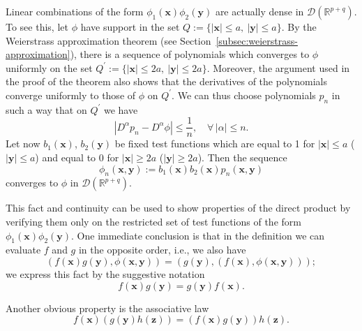 Linear combinations of the form $\phi_1(\bm{x})\phi_2(\bm{y})$ are actually dense in $\mathcal{D}(\mathbb{R}^{p+q})$. To see this, let $\phi$ have support in the set $Q:=\{|\bm{x}|\leq a,\ |\bm{y}|\leq a\}$. By the Weierstrass approximation theorem (see Section~\ref{subsec:weierstrass-approximation}), there is a sequence of polynomials which converges to $\phi$ uniformly on the set $Q^{\prime}:=\{|\bm{x}|\leq2a,\ |\bm{y}|\leq2a\}$. Moreover, the argument used in the proof of the theorem also shows that the derivatives of the polynomials converge uniformly to those of $\phi$ on $Q^{\prime}$. We can thus choose polynomials $p_n$ in such a way that on $Q^{\prime}$ we have
\begin{equation}\label{eq:direct-product-polynomial-derivative-approximation}
|D^\alpha p_n-D^\alpha\phi|\leq\dfrac1n,\quad\forall\,|\alpha|\leq n.
\end{equation}
Let now $b_1(\bm{x})$, $b_2(\bm{y})$ be fixed test functions which are equal to 1 for $|\bm{x}|\leq a$ ($|\bm{y}|\leq a$) and equal to 0 for $|\bm{x}|\geq2a$ ($|\bm{y}|\geq2a$). Then the sequence
\begin{equation}\label{eq:direct-product-cutoff-polynomial-approximation}
\phi_n(\bm{x},\bm{y}):=b_1(\bm{x})b_2(\bm{x})p_n(\bm{x},\bm{y})
\end{equation}
converges to $\phi$ in $\mathcal{D}(\mathbb{R}^{p+q})$.

This fact and continuity can be used to show properties of the direct product by verifying them only on the restricted set of test functions of the form $\phi_1(\bm{x})\phi_2(\bm{y})$. One immediate conclusion is that in the definition we can evaluate $f$ and $g$ in the opposite order, i.e., we also have
\begin{equation}\label{eq:direct-product-reversed-pairing}
(f(\bm{x})g(\bm{y}),\phi(\bm{x},\bm{y}))=(g(\bm{y}),(f(\bm{x}),\phi(\bm{x},\bm{y})));
\end{equation}
we express this fact by the suggestive notation
\begin{equation}\label{eq:distribution-direct-product-commutativity}
f(\bm{x})g(\bm{y})=g(\bm{y})f(\bm{x}).
\end{equation}


Another obvious property is the associative law
\begin{equation}\label{eq:distribution-direct-product-associativity}
f(\bm{x})(g(\bm{y})h(\bm{z}))=(f(\bm{x})g(\bm{y}))h(\bm{z}).
\end{equation}

